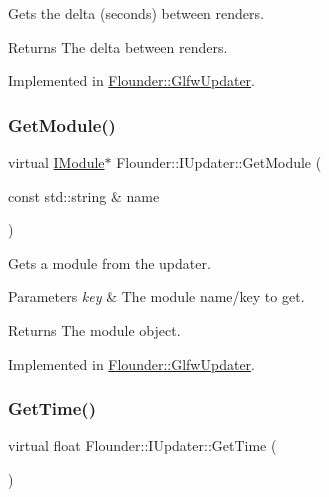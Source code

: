 Gets the delta (seconds) between renders. 

\begin{DoxyReturn}{Returns}
The delta between renders. 
\end{DoxyReturn}


Implemented in \hyperlink{class_flounder_1_1_glfw_updater_ad93f3d6d4fde740f66339f5b894e5869}{Flounder\+::\+Glfw\+Updater}.

\mbox{\label{class_flounder_1_1_i_updater_a074668562d355a9130c2048b32a8f422}} 
\subsubsection{\texorpdfstring{Get\+Module()}{GetModule()}}
{\footnotesize\ttfamily virtual \hyperlink{class_flounder_1_1_i_module}{I\+Module}$\ast$ Flounder\+::\+I\+Updater\+::\+Get\+Module (\begin{DoxyParamCaption}\item[{const std\+::string \&}]{name }\end{DoxyParamCaption})\hspace{0.3cm}{\ttfamily [pure virtual]}}



Gets a module from the updater. 


\begin{DoxyParams}{Parameters}
{\em key} & The module name/key to get. \\
\hline
\end{DoxyParams}
\begin{DoxyReturn}{Returns}
The module object. 
\end{DoxyReturn}


Implemented in \hyperlink{class_flounder_1_1_glfw_updater_a7dbe6de40b5596a8f6501235645807ed}{Flounder\+::\+Glfw\+Updater}.

\mbox{\label{class_flounder_1_1_i_updater_a2a3f3c2a0308eea36414d51242206a3e}} 
\subsubsection{\texorpdfstring{Get\+Time()}{GetTime()}}
{\footnotesize\ttfamily virtual float Flounder\+::\+I\+Updater\+::\+Get\+Time (\begin{DoxyParamCaption}{ }\end{DoxyParamCaption})\hspace{0.3cm}{\ttfamily [pure virtual]}}



